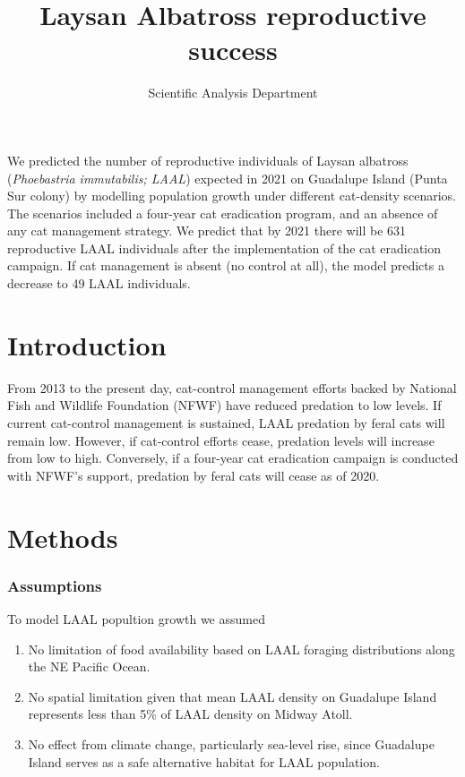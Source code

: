 \documentclass{article}
\author{Scientific Analysis Department}
\title{Laysan Albatross reproductive success}
\begin{document}
\maketitle

We predicted the number of reproductive individuals of Laysan albatross (\textit{Phoebastria immutabilis; LAAL}) expected in 2021 on Guadalupe Island (Punta Sur colony) by modelling population growth under different cat-density scenarios. The scenarios included a four-year cat eradication program, and an absence of any cat management strategy. We predict that by 2021 there will be 631 reproductive LAAL individuals after the implementation of the cat eradication campaign. If cat management is absent (no control at all), the model predicts a decrease to 49 LAAL individuals.

\section*{Introduction}
From 2013 to the present day, cat-control management efforts backed by National Fish and Wildlife Foundation (NFWF) have reduced predation to low levels. If current cat-control management is sustained, LAAL predation by feral cats will remain low. However, if cat-control efforts cease, predation levels will increase from low to high. Conversely, if a four-year cat eradication campaign is conducted with NFWF’s support, predation by feral cats will cease as of 2020.

\section*{Methods}

\subsubsection*{Assumptions}
To  model LAAL popultion growth we assumed
\begin{enumerate}
\item{No limitation of food availability based on LAAL foraging distributions along the NE Pacific Ocean.}
\item{No spatial limitation given that mean LAAL density on Guadalupe Island represents less than 5\% of LAAL density on Midway Atoll.}
\item{No effect from climate change, particularly sea-level rise, since Guadalupe Island serves as a safe alternative habitat for LAAL population.}
\end{enumerate}
\end{document}
